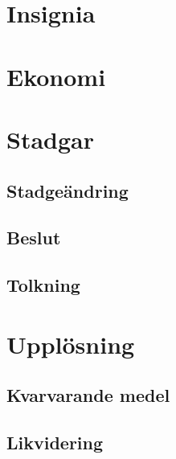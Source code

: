 \documentclass{article}
\begin{document}
\section{Insignia}

\section{Ekonomi}

\section{Stadgar}
\subsection{Stadgeändring}
\subsection{Beslut}
\subsection{Tolkning}

\section{Upplösning}
\subsection{Kvarvarande medel}
\subsection{Likvidering}
\end{document}
